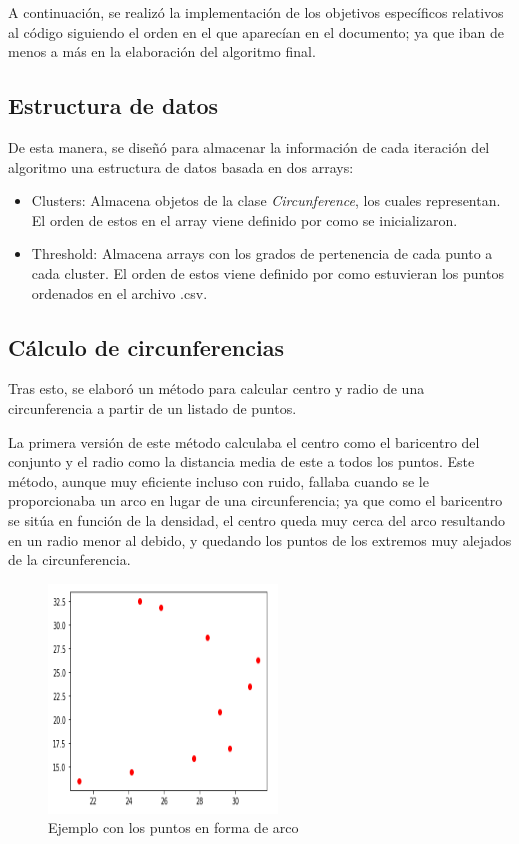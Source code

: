 \documentclass[conference,a4paper]{IEEEtran}
\begin{document}
A continuación, se realizó la implementación de los objetivos específicos relativos al código siguiendo el orden en el que aparecían en el documento; ya que iban de menos a más en la elaboración del algoritmo final.

\subsection{Estructura de datos}

De esta manera, se diseñó para almacenar la información de cada iteración del algoritmo una estructura de datos basada en dos arrays: 
\begin{itemize}
	\item Clusters: Almacena objetos de la clase \textit{Circunference}, los cuales representan. El orden de estos en el array viene definido por como se inicializaron.
	\item Threshold: Almacena arrays con los grados de pertenencia de cada punto a cada cluster. El orden de estos viene definido por como estuvieran los puntos ordenados en el archivo .csv.
\end{itemize}

\subsection{Cálculo de circunferencias}

Tras esto, se elaboró un método para calcular centro y radio de una circunferencia a partir de un listado de puntos.

La primera versión de este método calculaba el centro como el baricentro del conjunto y el radio como la distancia media de este a todos los puntos. Este método, aunque muy eficiente incluso con ruido, fallaba cuando se le proporcionaba un arco en lugar de una circunferencia; ya que como el baricentro se sitúa en función de la densidad, el centro queda muy cerca del arco resultando en un radio menor al debido, y quedando los puntos de los extremos muy alejados de la circunferencia.

\begin{figure}[H]
\centering
\includegraphics[scale=0.9]{ArcoBaricentro}
\caption{Ejemplo con los puntos en forma de arco}
\end{figure}
\end{document}

